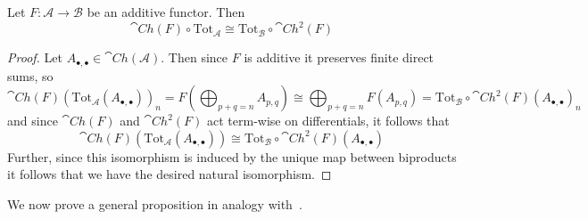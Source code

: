 \begin{lem}[label=lem:totComm]
    Let $F:\mathcal{A}\to \mathcal{B}$ be an additive functor. Then 
    \begin{equation*}
        \cat{Ch}(F)\circ \text{Tot}_\mathcal{A} \cong \text{Tot}_\mathcal{B}\circ \cat{Ch}^2(F)
    \end{equation*}
\end{lem}
\begin{proof}
    Let $A_{\bullet,\bullet} \in \cat{Ch}(\mathcal{A})$. Then since $F$ is additive it preserves finite direct sums, so 
    \begin{equation*}
        \cat{Ch}(F)(\text{Tot}_\mathcal{A}(A_{\bullet,\bullet}))_n = F\left(\bigoplus_{p+q=n}A_{p,q}\right) \cong \bigoplus_{p+q=n}F(A_{p,q}) = \text{Tot}_\mathcal{B}\circ \cat{Ch}^2(F)(A_{\bullet,\bullet})_n
    \end{equation*}
    and since $\cat{Ch}(F)$ and $\cat{Ch}^2(F)$ act term-wise on differentials, it follows that
    \begin{equation*}
        \cat{Ch}(F)(\text{Tot}_\mathcal{A}(A_{\bullet,\bullet})) \cong \text{Tot}_\mathcal{B}\circ \cat{Ch}^2(F)(A_{\bullet,\bullet})
    \end{equation*}
    Further, since this isomorphism is induced by the unique map between biproducts it follows that we have the desired natural isomorphism.
\end{proof}


We now prove a general proposition in analogy with~\cite[Prop 4.5]{BJORT}.

